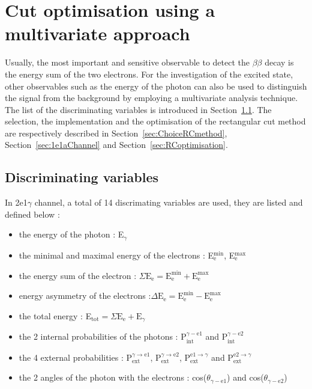 \documentclass[main.tex]{subfiles}
\begin{document}
\FloatBarrier



\section{Cut optimisation using a multivariate approach}\label{sec:CutOptimisation}


\NI Usually, the most important and sensitive observable to detect the $\beta\beta$ decay is the energy sum of the two electrons. For the investigation of the excited state, other observables such as the energy of the photon can also be used to distinguish the signal from the background by employing a multivariate analysis technique. The list of the discriminating variables is introduced in Section~\ref{sec:discriminatingVariables}. The selection, the implementation and the optimisation of the rectangular cut method are respectively described in Section~\ref{sec:ChoiceRCmethod}, Section~\ref{sec:1e1aChannel} and Section~\ref{sec:RCoptimisation}.



\subsection{Discriminating variables}\label{sec:discriminatingVariables}

In 2e1$\gamma$ channel, a total of 14 discrimating variables are used, they are listed and defined below : 

\begin{itemize}
\item the energy of the photon : E$_{\gamma}$
\item the minimal and maximal energy of the electrons : E$_\text{e}^{\text{min}}$, E$_\text{e}^{\text{max}}$
\item the energy sum of the electron : $\Sigma\text{E}_\text{e} = \text{E}_\text{e}^{\text{min}} +  \text{E}_\text{e}^{\text{max}}$
\item energy asymmetry of the electrons :$\Delta\text{E}_\text{e} = \text{E}_\text{e}^{\text{min}} -  \text{E}_\text{e}^{\text{max}}$
\item the total energy : E$_{\text{tot}} = \Sigma\text{E}_{\text{e}} + \text{E}_{\gamma}$
\item the 2 internal probabilities of the photons : P$_{\text{int}}^{\gamma-\text{e1}}$ and  P$_{\text{int}}^{\gamma-\text{e2}}$
\item the 4 external probabilities : P$_{\text{ext}}^{\gamma \rightarrow \text{e1}}$, P$_{\text{ext}}^{\gamma \rightarrow \text{e2}}$, P$_{\text{ext}}^{ \text{e1} \rightarrow\gamma}$ and P$_{\text{ext}}^{ \text{e2} \rightarrow\gamma}$
\item the 2 angles of the photon with the electrons : cos($\theta_{\gamma-\text{e1}}$) and cos($\theta_{\gamma-\text{e2}}$)
\end{itemize}
\end{document}
